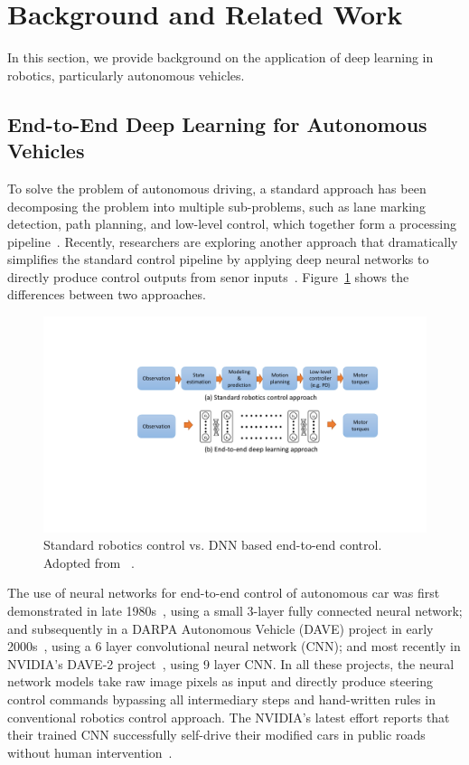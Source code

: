 \section{Background and Related Work} \label{sec:background}

In this section, we provide background on the application of deep
learning in robotics, particularly autonomous vehicles.

\subsection{End-to-End Deep Learning for Autonomous Vehicles}


To solve the problem of autonomous driving, a standard approach has
been decomposing the problem into multiple sub-problems,
such as lane marking detection, path planning, and low-level
control, which together form a processing pipeline~\cite{Bojarski2016}.
Recently, researchers are exploring another approach that dramatically
simplifies the standard control pipeline by applying deep neural
networks to directly produce control outputs from senor
inputs~\cite{Levine2016}. Figure~\ref{fig:end-to-end-control}
shows the differences between two approaches.

\begin{figure}[h]
  \centering
  \includegraphics[width=.5\textwidth]{figs/endtoend_redrawn}
  \caption{Standard robotics control vs. DNN based end-to-end
    control. Adopted from ~\cite{Levine2017cs294}.}
  \label{fig:end-to-end-control}
\end{figure}

The use of neural networks for end-to-end control of autonomous
car was first demonstrated in late 1980s~\cite{Pomerleau1989},
using a small 3-layer fully connected neural network; and subsequently
in a DARPA Autonomous Vehicle (DAVE) project in early
2000s~\cite{LeCun:04}, using a 6 layer convolutional neural network
(CNN); and most recently in NVIDIA's DAVE-2
project~\cite{Bojarski2016}, using 9 layer CNN. In all these projects,
the neural network models take raw image pixels as input and directly
produce steering control commands bypassing all intermediary steps and
hand-written rules in conventional robotics control approach. The
NVIDIA's latest effort reports that their trained CNN successfully
self-drive their modified cars in public roads without human
intervention~\cite{Bojarski2016}.

